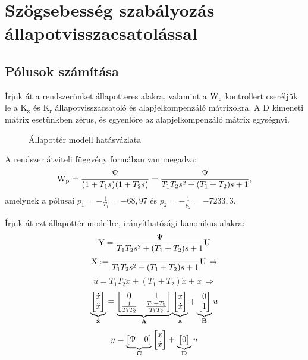 \section{Szögsebesség szabályozás állapotvisszacsatolással}

\subsection{Pólusok számítása}

Írjuk át a rendszerünket állapotteres alakra, valamint a $\mathrm{W}_\text{c}$ kontrollert
cseréljük le a $\mathrm{K}_\text{x}$ és $\mathrm{K}_\text{r}$ állapotvisszacsatoló és
alapjelkompenzáló mátrixokra.
A $\mathrm{D}$ kimeneti mátrix esetünkben zérus, és egyenlőre az
alapjelkompenzáló mátrix egységnyi.

\begin{figure}[H]
    \centering
    \caption{Állapottér modell hatásvázlata}
    \label{fig:5a_allapotter_hatasvazlat}
\end{figure}

A rendszer átviteli függvény formában van megadva:
\begin{equation}
	\mathrm{W}_\text{p} = \frac{\Psi}{(1+T_1s)(1+T_2s)} = \frac{\Psi}{T_1T_2s^2+(T_1+T_2)s+1},
\end{equation}
amelynek a pólusai $p_1=-\frac{1}{T_1} = -68,97$ és $p_2=-\frac{1}{p_2} = -7233,3$.

Írjuk át ezt állapottér modellre, irányíthatósági kanonikus alakra:
\begin{equation}
	\mathrm{Y} = \frac{\Psi}{T_1T_2s^2+(T_1+T_2)s+1}\mathrm{U}
\end{equation}
\begin{equation}
	\mathrm{X} := \frac{}{T_1T_2s^2+(T_1+T_2)s+1}\mathrm{U}\,\Rightarrow
\end{equation}
\begin{equation}
	u = T_1T_2\ddot{x} + (T_1+T_2)\dot{x} + x\,\Rightarrow
\end{equation}
\begin{equation}
	\underbrace{\begin{bmatrix}\dot{x}\\\ddot{x}\end{bmatrix}}_{\dot{\boldsymbol{\mathrm{x}}}}
	= \underbrace{\begin{bmatrix}0&1\\\frac{1}{T_1T_2}&\frac{T_1+T_2}{T_1T_2}\end{bmatrix}}_{\boldsymbol{\mathrm{A}}}
	\underbrace{\begin{bmatrix}x\\\dot{x}\end{bmatrix}}_{\boldsymbol{\mathrm{x}}}
	+ \underbrace{\begin{bmatrix}0\\1\end{bmatrix}}_{\boldsymbol{\mathrm{B}}}u
\end{equation}
\begin{equation}
	y = \underbrace{\begin{bmatrix}\Psi&0\end{bmatrix}}_{\boldsymbol{\mathrm{C}}}\begin{bmatrix}x\\\dot{x}\end{bmatrix} + \underbrace{\begin{bmatrix}0\end{bmatrix}}_{\boldsymbol{\mathrm{D}}}u
\end{equation}

